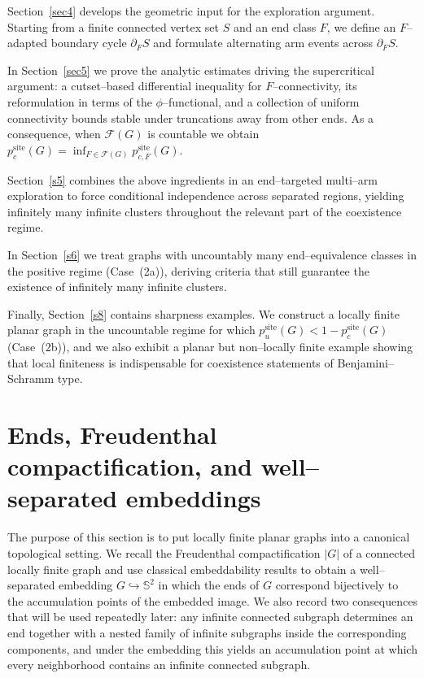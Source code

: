 \documentclass[11pt]{amsart}
\theoremstyle{plain}
\numberwithin{equation}{section}
\numberwithin{figure}{section}
\begin{document}
Section~\ref{sec4} develops the geometric input for the exploration argument.
Starting from a finite connected vertex set $S$ and an end class $F$, we define an $F$--adapted
boundary cycle $\partial_F S$ and formulate alternating arm events across $\partial_F S$.

In Section~\ref{sec5} we prove the analytic estimates driving the supercritical argument:
a cutset--based differential inequality for $F$--connectivity, its reformulation in terms of the
$\phi$--functional, and a collection of uniform connectivity bounds stable under truncations
away from other ends.  As a consequence, when $\mathcal F(G)$ is countable we obtain
$p^{\mathrm{site}}_c(G)=\inf_{F\in\mathcal F(G)}p^{\mathrm{site}}_{c,F}(G)$.

Section~\ref{s5} combines the above ingredients in an end--targeted multi--arm
exploration to force conditional independence across separated regions, yielding infinitely many
infinite clusters throughout the relevant part of the coexistence regime.

In Section~\ref{s6} we treat graphs with uncountably many end--equivalence classes
in the positive regime (Case~(2a)), deriving criteria that still guarantee the existence of infinitely
many infinite clusters.

Finally, Section~\ref{s8} contains sharpness examples.  We construct a locally finite planar
graph in the uncountable regime for which $p^{\mathrm{site}}_u(G)<1-p^{\mathrm{site}}_c(G)$ (Case~(2b)),
and we also exhibit a planar but non--locally finite example showing that local finiteness is indispensable
for coexistence statements of Benjamini--Schramm type.








\section{Ends, Freudenthal compactification, and well--separated embeddings}
\label{sect2}

The purpose of this section is to put locally finite planar graphs into a canonical topological
setting.  We recall the Freudenthal compactification $|G|$ of a connected locally finite graph and
use classical embeddability results to obtain a well--separated embedding $G\hookrightarrow\mathbb S^2$
in which the ends of $G$ correspond bijectively to the accumulation points of the embedded image.
We also record two consequences that will be used repeatedly later: any infinite connected subgraph
determines an end together with a nested family of infinite subgraphs inside the corresponding
components, and under the embedding this yields an accumulation point at which every neighborhood
contains an infinite connected subgraph.
\end{document}
